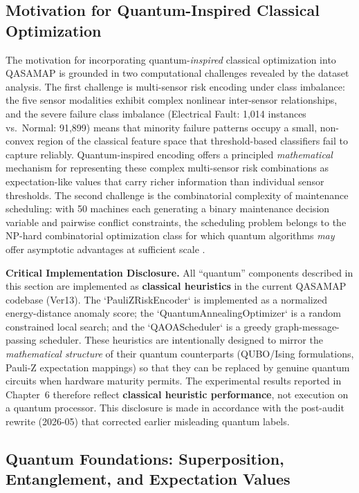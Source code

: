 \subsection{Motivation for Quantum-Inspired Classical Optimization}
\label{sec:quantum_integration}

The motivation for incorporating quantum-\emph{inspired} classical optimization into QASAMAP is grounded in two computational challenges revealed by the dataset analysis. The first challenge is multi-sensor risk encoding under class imbalance: the five sensor modalities exhibit complex nonlinear inter-sensor relationships, and the severe failure class imbalance (Electrical Fault: 1,014 instances vs.\ Normal: 91,899) means that minority failure patterns occupy a small, non-convex region of the classical feature space that threshold-based classifiers fail to capture reliably. Quantum-inspired encoding offers a principled \emph{mathematical} mechanism for representing these complex multi-sensor risk combinations as expectation-like values that carry richer information than individual sensor thresholds. The second challenge is the combinatorial complexity of maintenance scheduling: with 50 machines each generating a binary maintenance decision variable and pairwise conflict constraints, the scheduling problem belongs to the NP-hard combinatorial optimization class for which quantum algorithms \emph{may} offer asymptotic advantages at sufficient scale \cite{Blekos2024}.

\textbf{Critical Implementation Disclosure.} All ``quantum'' components described in this section are implemented as \textbf{classical heuristics} in the current QASAMAP codebase (Ver13). The `PauliZRiskEncoder` is implemented as a normalized energy-distance anomaly score; the `QuantumAnnealingOptimizer` is a random constrained local search; and the `QAOAScheduler` is a greedy graph-message-passing scheduler. These heuristics are intentionally designed to mirror the \emph{mathematical structure} of their quantum counterparts (QUBO/Ising formulations, Pauli-Z expectation mappings) so that they can be replaced by genuine quantum circuits when hardware maturity permits. The experimental results reported in Chapter~6 therefore reflect \textbf{classical heuristic performance}, not execution on a quantum processor. This disclosure is made in accordance with the post-audit rewrite (2026-05) that corrected earlier misleading quantum labels.

\subsection{Quantum Foundations: Superposition, Entanglement, and Expectation Values}

